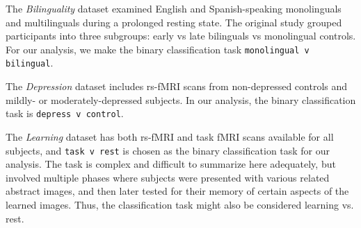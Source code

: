 \documentclass[12pt]{spieman}  %
\newcommand{\code}[1]{\small\texttt{#1}\normalsize}
\begin{document}
\begin{spacing}{2}

The \textit{Bilinguality} dataset\cite{ds001747:1.0.0,
goldcarrieelizabethExploringRestingState2018} examined English and
Spanish-speaking monolinguals and multilinguals during a prolonged resting
state. The original study grouped participants into three subgroups: early vs
late bilinguals vs monolingual
controls\cite{goldcarrieelizabethExploringRestingState2018}. For our analysis,
we make the binary classification task \code{monolingual v
bilingual}.



The \textit{Depression} dataset\cite{bezmaternykhddRestingStateClosed2021,
bezmaternykhBrainNetworksConnectivity2021} includes rs-fMRI scans from
non-depressed controls and mildly- or moderately-depressed subjects. In our
analysis, the binary classification task is \code{depress v control}.


The \textit{Learning} dataset\cite{schapiroHumanHippocampalReplay2018,
schapiroHumanHippocampalReplay2020} has both rs-fMRI and task fMRI scans
available for all subjects, and \code{task v rest} is chosen as the binary
classification task for our analysis.  The task is complex and difficult to
summarize here adequately, but involved multiple phases where subjects were
presented with various related abstract images, and then later tested for their
memory of certain aspects of the learned images. Thus, the classification task
might also be considered learning vs. rest.


\end{spacing}
\end{document}
